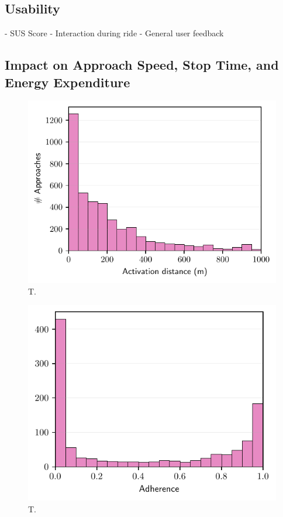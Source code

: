 \subsection{Usability}

- SUS Score
- Interaction during ride
- General user feedback

\subsection{Impact on Approach Speed, Stop Time, and Energy Expenditure}

\begin{figure}[t]
\caption{T.}\label{fig:}
\includegraphics[width=\linewidth]{images/impacts-activation-distances.pdf}
\end{figure}

\begin{figure}[t]
\caption{T.}\label{fig:}
\includegraphics[width=\linewidth]{images/impacts-adherence.pdf}
\end{figure}

